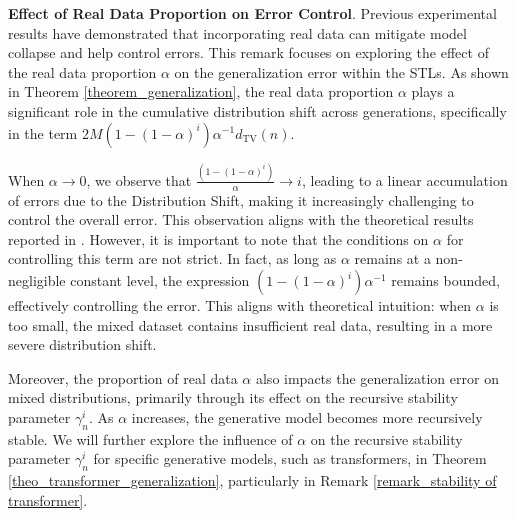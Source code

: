 \begin{remark}



\end{remark}
\begin{remark}\textbf{Effect of Real Data Proportion on Error Control}.\label{remark_real} Previous experimental results \citep{shumailov2024ai,alemohammadself} have demonstrated that incorporating real data can mitigate model collapse and help control errors. This remark focuses on exploring the effect of the real data proportion $\alpha$ on the generalization error within the STLs. As shown in Theorem \ref{theorem_generalization}, the real data proportion $\alpha$ plays a significant role in the cumulative distribution shift across generations, specifically in the term $2 M\left(1-(1-\alpha)^i\right) \alpha^{-1} d_{\mathrm{TV}}(n)$.

When \(\alpha \to 0\), we observe that \(\frac{(1 - (1 - \alpha)^i)}{\alpha} \to i\), leading to a linear accumulation of errors due to the Distribution Shift, making it increasingly challenging to control the overall error. This observation aligns with the theoretical results reported in \cite{shumailov2024ai,dohmatob2024model, futowards}. However, it is important to note that the conditions on $\alpha$ for controlling this term are not strict. In fact, as long as $\alpha$ remains at a non-negligible constant level, the expression $\left(1-(1-\alpha)^i\right) \alpha^{-1}$ remains bounded, effectively controlling the error. This aligns with theoretical intuition: when $\alpha$ is too small, the mixed dataset contains insufficient real data, resulting in a more severe distribution shift.

Moreover, the proportion of real data $\alpha$ also impacts the generalization error on mixed distributions, primarily through its effect on the recursive stability parameter $\gamma_n^i$. As $\alpha$ increases, the generative model becomes more recursively stable. We will further explore the influence of $\alpha$ on the recursive stability parameter $\gamma_n^i$ for specific generative models, such as transformers, in Theorem \ref{theo_transformer_generalization}, particularly in Remark \ref{remark_stability of transformer}.
    
\end{remark}

